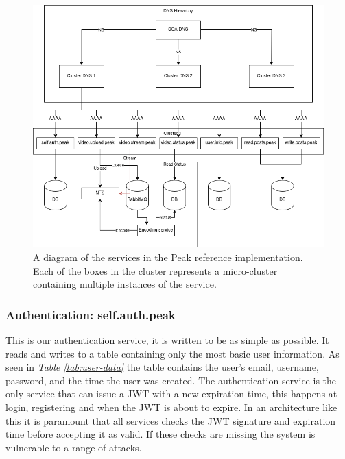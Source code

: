 \documentclass[12pt]{article}
\begin{document}
\begin{figure}[h]
    \includegraphics[width=1\textwidth]{service-diagram.drawio.png}
    \caption{A diagram of the services in the Peak reference implementation. Each of the boxes in the cluster represents a micro-cluster containing multiple instances of the service.}
    \label{fig:service-diagram}
\end{figure}

\newpage

\subsubsection{Authentication: self.auth.peak}
This is our authentication service, it is written to be as simple as possible.
It reads and writes to a table containing only the most basic user information.
As seen in \textit{Table \ref{tab:user-data}} the table contains the user's email, 
username, password, and the time the user was created. The authentication service
is the only service that can issue a JWT with a new expiration time, this
happens at login, registering and when the JWT is about to expire.
In an architecture like this it is paramount that all services checks
the JWT signature and expiration time before accepting it as valid.
If these checks are missing the system is vulnerable to a range of attacks.
\end{document}
